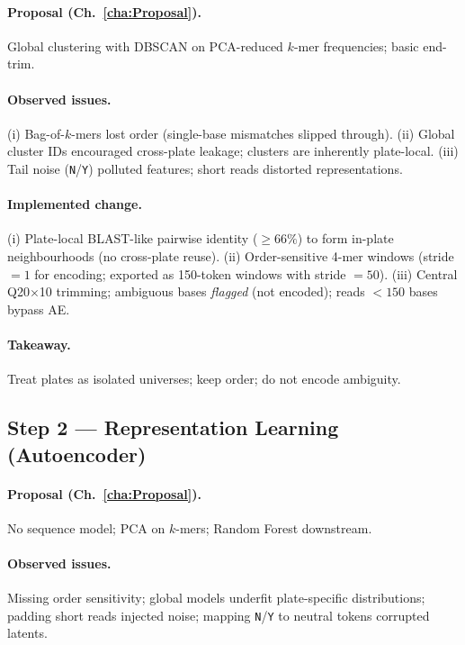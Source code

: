 \paragraph{Proposal (Ch.~\ref{cha:Proposal}).}
Global clustering with DBSCAN on PCA-reduced $k$-mer frequencies; basic end-trim.

\paragraph{Observed issues.}
(i) Bag-of-$k$-mers lost order (single-base mismatches slipped through). 
(ii) Global cluster IDs encouraged cross-plate leakage; clusters are inherently plate-local.
(iii) Tail noise (\texttt{N}/\texttt{Y}) polluted features; short reads distorted representations.

\paragraph{Implemented change.}
(i) Plate-local BLAST-like pairwise identity ($\geq 66\%$) to form in-plate neighbourhoods (no cross-plate reuse). 
(ii) Order-sensitive 4-mer windows (stride $=1$ for encoding; exported as 150-token windows with stride $=50$). 
(iii) Central Q20$\times$10 trimming; ambiguous bases \emph{flagged} (not encoded); reads $<150$ bases bypass AE.

\paragraph{Takeaway.} Treat plates as isolated universes; keep order; do not encode ambiguity.

\subsection*{Step 2 — Representation Learning (Autoencoder)}
\paragraph{Proposal (Ch.~\ref{cha:Proposal}).}
No sequence model; PCA on $k$-mers; Random Forest downstream.

\paragraph{Observed issues.}
Missing order sensitivity; global models underfit plate-specific distributions; padding short reads injected noise; mapping \texttt{N}/\texttt{Y} to neutral tokens corrupted latents.

